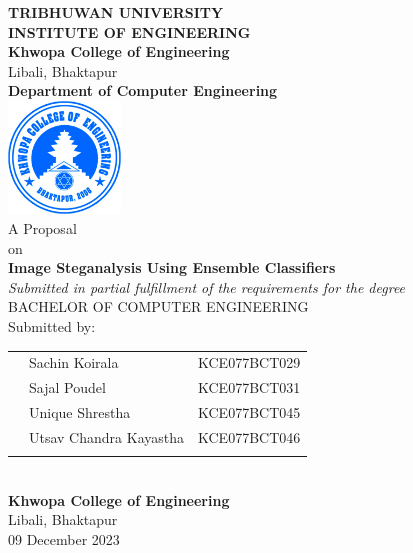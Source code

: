 \begin{center}
\thispagestyle{empty} %
\large{\bf{TRIBHUWAN UNIVERSITY \\ INSTITUTE OF ENGINEERING}}\\
\vspace{0.3cm}
\normalsize{\bf{Khwopa College of Engineering}} \\
\small{ Libali, Bhaktapur} \\
\normalsize{\bf{Department of Computer Engineering}} \\
\parskip 10mm
\includegraphics [width =30mm] {./img/Khwopalogo.jpg} \\
\vspace{0.3cm}
\normalsize{A Proposal \\ on} \\
\normalsize{\bf{Image Steganalysis Using Ensemble Classifiers  }} \\
\normalsize{\textit{Submitted in partial fulfillment of the requirements for the degree}}
\vspace{0.3cm} \\
\large{BACHELOR OF COMPUTER ENGINEERING}\\
\vspace{3.5cm}
Submitted by:\\
\begin{tabular}{p{0.5in}p{3.5in}p{3in}}
\hspace{0.3cm}&Sachin Koirala&KCE077BCT029\\
\hspace{0.3cm}&Sajal Poudel&KCE077BCT031\\
\hspace{0.3cm}&Unique Shrestha&KCE077BCT045\\
\hspace{0.3cm}&Utsav Chandra Kayastha&KCE077BCT046\\
\vspace{0.3cm}
\end{tabular}
\vspace{0.3cm} \\
\Large{\bf{Khwopa College of Engineering}}\\
\small{Libali, Bhaktapur}\\
\small{09 December 2023}
\end{center}

